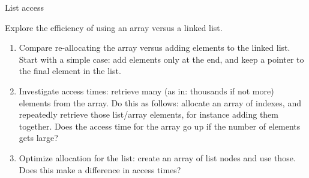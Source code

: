 
 {List access}

\begin{exercise}
  Explore the efficiency of using an array versus a linked list.
  \begin{enumerate}
  \item Compare re-allocating the array versus adding elements to the
    linked list. Start with a simple case: add elements only at the
    end, and keep a pointer to the final element in the list.
  \item Investigate access times: retrieve many (as in: thousands if
    not more) elements from the array. Do this as follows: allocate an
    array of indexes, and repeatedly retrieve those list/array
    elements, for instance adding them together. Does the access time
    for the array go up if the number of elements gets large?
  \item Optimize allocation for the list: create an array of list
    nodes and use those. Does this make a difference in access times?
  \end{enumerate}
\end{exercise}
